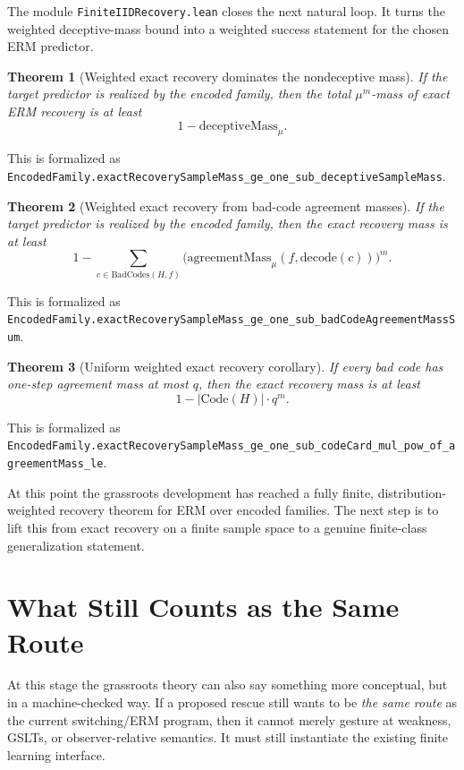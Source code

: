\documentclass[11pt]{article}
\newtheorem{theorem}{Theorem}[section]
\theoremstyle{remark}
\begin{document}
The module \texttt{FiniteIIDRecovery.lean} closes the next natural loop.  It
turns the weighted deceptive-mass bound into a weighted success statement for the
chosen ERM predictor.

\begin{theorem}[Weighted exact recovery dominates the nondeceptive mass]
If the target predictor is realized by the encoded family, then the total
\(\mu^m\)-mass of exact ERM recovery is at least
\[
  1 - \mathrm{deceptiveMass}_{\mu}.
\]
\end{theorem}

\noindent
This is formalized as
\texttt{EncodedFamily.exactRecoverySampleMass\_ge\_one\_sub\_deceptiveSampleMass}.

\begin{theorem}[Weighted exact recovery from bad-code agreement masses]
If the target predictor is realized by the encoded family, then the exact
recovery mass is at least
\[
  1 - \sum_{c \in \mathrm{BadCodes}(H,f)}
    \bigl(\mathrm{agreementMass}_{\mu}(f,\mathrm{decode}(c))\bigr)^m.
\]
\end{theorem}

\noindent
This is formalized as
\texttt{EncodedFamily.exactRecoverySampleMass\_ge\_one\_sub\_badCodeAgreementMassSum}.

\begin{theorem}[Uniform weighted exact recovery corollary]
If every bad code has one-step agreement mass at most \(q\), then the exact
recovery mass is at least
\[
  1 - |\mathrm{Code}(H)| \cdot q^m.
\]
\end{theorem}

\noindent
This is formalized as
\texttt{EncodedFamily.exactRecoverySampleMass\_ge\_one\_sub\_codeCard\_mul\_pow\_of\_agreementMass\_le}.

At this point the grassroots development has reached a fully finite,
distribution-weighted recovery theorem for ERM over encoded families.  The next
step is to lift this from exact recovery on a finite sample space to a genuine
finite-class generalization statement.

\section{What Still Counts as the Same Route}

At this stage the grassroots theory can also say something more conceptual, but
in a machine-checked way.  If a proposed rescue still wants to be \emph{the same
route} as the current switching/ERM program, then it cannot merely gesture at
weakness, GSLTs, or observer-relative semantics.  It must still instantiate the
existing finite learning interface.
\end{document}
